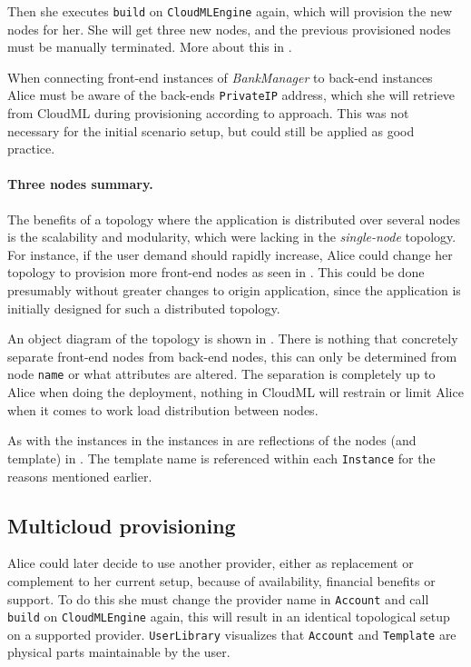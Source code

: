 Then she executes \texttt{build} on \texttt{CloudMLEngine} again,
which will provision the new nodes for her.
She will get three new nodes, and the previous provisioned nodes must be manually terminated.
More about this in .

When connecting front-end instances of \emph{BankManager} to back-end instances Alice must 
be aware of the back-ends \texttt{PrivateIP} address, which she will retrieve from CloudML
during provisioning according to  approach.
This was not necessary for the initial scenario setup, but could still be applied
as good practice.

\paragraph{Three nodes summary.}


The benefits of a topology where the application is distributed over several nodes 
is the scalability and modularity, which were lacking in the \emph{single-node} topology.
For instance, if the user demand should rapidly increase, Alice could change her topology to
provision more front-end nodes as seen in .
This could be done presumably without greater changes to origin application,
since the application is initially designed for such a distributed topology.

An object diagram of the topology is shown in .
There is nothing that concretely separate front-end nodes from back-end nodes,
this can only be determined from node \texttt{name} or what attributes are altered.
The separation is completely up to Alice when doing the deployment,
\ie nothing in CloudML will restrain or limit Alice 
when it comes to work load distribution between nodes.

As with the instances in  the instances in 
are reflections of the nodes (and template) in .
The template name is referenced within each \texttt{Instance} 
for the reasons mentioned earlier.

\subsection{Multicloud provisioning}
Alice could later decide to use another provider, either as replacement or complement to her current setup,
because of availability, financial benefits or support.
To do this she must change the provider name in \texttt{Account} and call \texttt{build} on \texttt{CloudMLEngine} again,
this will result in an identical topological setup on a supported provider.
\texttt{UserLibrary} visualizes that \texttt{Account} and \texttt{Template} are 
physical parts maintainable by the user.

